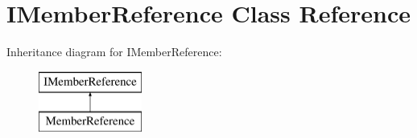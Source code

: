 \hypertarget{class_i_member_reference}{}\section{I\+Member\+Reference Class Reference}
\label{class_i_member_reference}
Inheritance diagram for I\+Member\+Reference\+:\begin{figure}[H]
\begin{center}
\leavevmode
\includegraphics[height=2.000000cm]{class_i_member_reference}
\end{center}
\end{figure}

